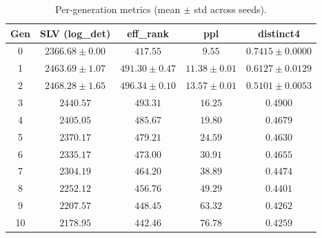 \begin{table}[t]
\centering
\caption{Per-generation metrics (mean $\pm$ std across seeds).}
\label{tab:seed_comparison}
\begin{tabular}{ccccc}
\toprule
Gen & SLV (log_det) & eff_rank & ppl & distinct4 \\
\midrule
0 & $2366.68 \pm 0.00$ & $417.55$ & $9.55$ & $0.7415 \pm 0.0000$ \\
1 & $2463.69 \pm 1.07$ & $491.30 \pm 0.47$ & $11.38 \pm 0.01$ & $0.6127 \pm 0.0129$ \\
2 & $2468.28 \pm 1.65$ & $496.34 \pm 0.10$ & $13.57 \pm 0.01$ & $0.5101 \pm 0.0053$ \\
3 & $2440.57$ & $493.31$ & $16.25$ & $0.4900$ \\
4 & $2405.05$ & $485.67$ & $19.80$ & $0.4679$ \\
5 & $2370.17$ & $479.21$ & $24.59$ & $0.4630$ \\
6 & $2335.17$ & $473.00$ & $30.91$ & $0.4655$ \\
7 & $2304.19$ & $464.20$ & $38.89$ & $0.4474$ \\
8 & $2252.12$ & $456.76$ & $49.29$ & $0.4401$ \\
9 & $2207.57$ & $448.45$ & $63.32$ & $0.4262$ \\
10 & $2178.95$ & $442.46$ & $76.78$ & $0.4259$ \\
\bottomrule
\end{tabular}
\end{table}